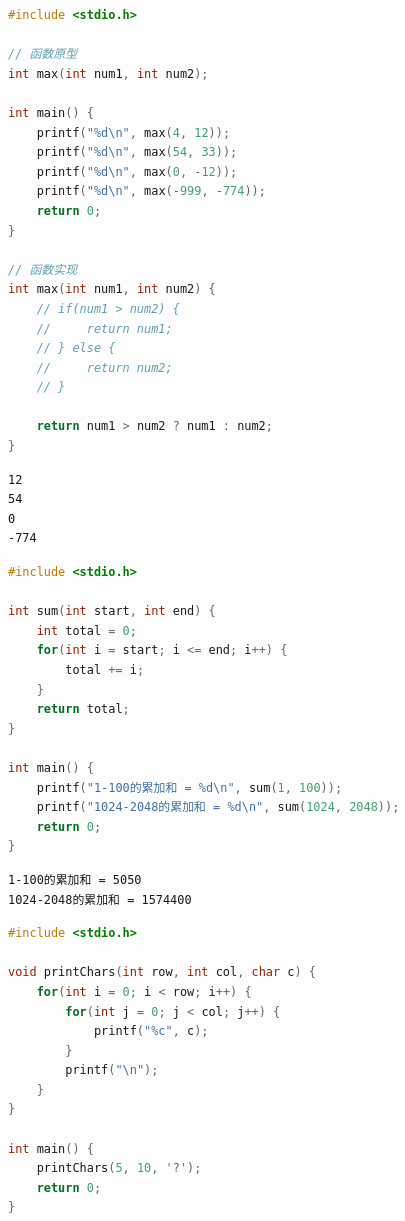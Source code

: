 \vspace{0.5cm}


\begin{lstlisting}[language=C]
#include <stdio.h>

// 函数原型
int max(int num1, int num2);

int main() {
	printf("%d\n", max(4, 12));
	printf("%d\n", max(54, 33));
	printf("%d\n", max(0, -12));
	printf("%d\n", max(-999, -774));
	return 0;
}

// 函数实现
int max(int num1, int num2) {
	// if(num1 > num2) {
	//     return num1;
	// } else {
	//     return num2;
	// }
	
	return num1 > num2 ? num1 : num2;
}
\end{lstlisting}

\begin{tcolorbox}
	\begin{verbatim}
12
54
0
-774
	\end{verbatim}
\end{tcolorbox}

\vspace{0.5cm}


\begin{lstlisting}[language=C]
#include <stdio.h>

int sum(int start, int end) {
	int total = 0;
	for(int i = start; i <= end; i++) {
		total += i;
	}
	return total;
}

int main() {
	printf("1-100的累加和 = %d\n", sum(1, 100));
	printf("1024-2048的累加和 = %d\n", sum(1024, 2048));
	return 0;
}
\end{lstlisting}

\begin{tcolorbox}
	\begin{verbatim}
1-100的累加和 = 5050
1024-2048的累加和 = 1574400
	\end{verbatim}
\end{tcolorbox}

\vspace{0.5cm}


\begin{lstlisting}[language=C]
#include <stdio.h>

void printChars(int row, int col, char c) {
	for(int i = 0; i < row; i++) {
		for(int j = 0; j < col; j++) {
			printf("%c", c);
		}
		printf("\n");
	}
}

int main() {
	printChars(5, 10, '?');
	return 0;
}
\end{lstlisting}

